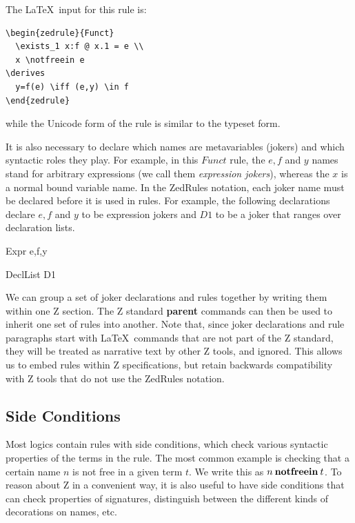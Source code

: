 \documentclass{entcs}
\begin{document}
The \LaTeX\ input for this rule is:
\begin{verbatim}
\begin{zedrule}{Funct}
  \exists_1 x:f @ x.1 = e \\
  x \notfreein e
\derives
  y=f(e) \iff (e,y) \in f
\end{zedrule}
\end{verbatim}
while the Unicode form of the rule is similar to the typeset form.

It is also necessary to declare which names are metavariables
(jokers) and which syntactic roles they play.  For example, in
this $Funct$ rule, the $e,f$ and $y$ names stand for arbitrary
expressions (we call them \emph{expression jokers}), whereas the $x$
is a normal bound variable name.  In the ZedRules notation, each
joker name must be declared before it is used in rules.  For example,
the following declarations declare $e,f$ and $y$ to be expression
jokers and $D1$ to be a joker that ranges over declaration lists.

\begin{zedjoker}{Expr} e,f,y \end{zedjoker}
\begin{zedjoker}{DeclList} D1 \end{zedjoker}

We can group a set of joker declarations and rules together by writing
them within one Z section.  The Z standard \textbf{parent} commands
can then be used to inherit one set of rules into another.  Note that,
since joker declarations and rule paragraphs start with \LaTeX\
commands that are not part of the Z standard, they will be treated as
narrative text by other Z tools, and ignored.  This allows us to embed
rules within Z specifications, but retain backwards compatibility
with Z tools that do not use the ZedRules notation.


\subsection{Side Conditions}

Most logics contain rules with side conditions, which check various
syntactic properties of the terms in the rule.  The most common
example is checking that a certain name $n$ is not free in a given
term $t$.  We write this as $n \mathbin{\mathop{\mathstrut{\mbox{\textbf{notfreein}}}}\nolimits} t$.  To reason about Z in a
convenient way, it is also useful to have side conditions that can
check properties of signatures, distinguish between the different
kinds of decorations on names, etc.
\end{document}
